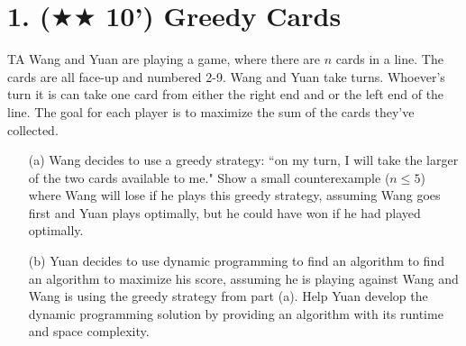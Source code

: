 \documentclass{article}
\begin{document}
\section*{1. ($\bigstar\bigstar$ 10') Greedy Cards}

TA Wang and Yuan are playing a game, where there are $n$ cards in a line. The cards are all face-up and numbered 2-9. Wang and Yuan take turns. Whoever's turn it is can take one card from either the right end and or the left end of the line. The goal for each player is to maximize the sum of the cards they've collected.

\begin{enumerate}
\item[(a)] Wang decides to use a greedy strategy: ``on my turn, I will take the larger of the two cards available to me." Show a small counterexample ($n\leq 5$) where Wang will lose if he plays this greedy strategy, assuming Wang goes first and Yuan plays optimally, but he could have won if he had played optimally.

\item[(b)] Yuan decides to use dynamic programming to find an algorithm to find an algorithm to maximize his score, assuming he is playing against Wang and Wang is using the greedy strategy from part (a). Help Yuan develop the dynamic programming solution by providing an algorithm with its runtime and space complexity.
\end{enumerate}
\end{document}
